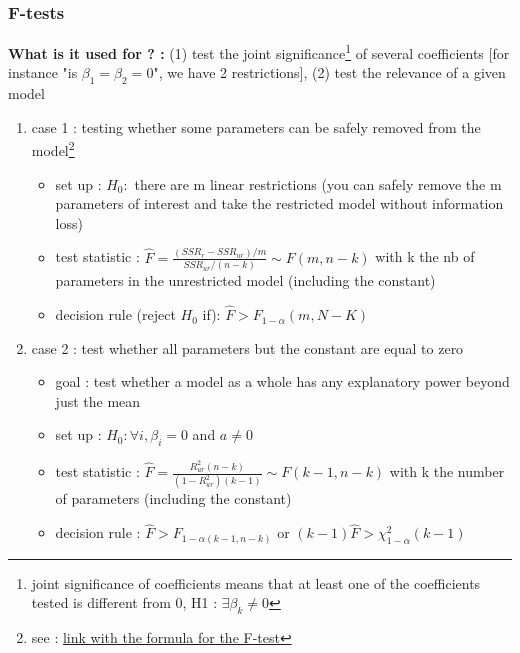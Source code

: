 \documentclass{article}
\begin{document}
\subsubsection{F-tests}
\begin{Fisherbox}
\textbf{What is it used for ? :} (1) test the joint significance\footnote{joint significance of coefficients means that at least one of the coefficients tested is different from 0, H1 : $\exists\beta_k\neq0$} of several coefficients [for instance "is $\beta_1=\beta_2=0$", we have 2 restrictions], (2)  test the relevance of a given model 
\begin{enumerate}
    \item case 1 : testing whether some parameters can be safely removed from the model\footnote{see :  \href{https://www.statisticshowto.com/probability-and-statistics/hypothesis-testing/f-test/}{link with the formula for the F-test} }
    \begin{itemize}
        \item set up : $H_0 :$ there are m linear restrictions (you can safely remove the m parameters of interest and take the restricted model without information loss)
        \item test statistic : $\hat{F}= \frac{(SSR_{r}-SSR_{ur})/m}{SSR_{ur}/(n-k)}\sim F(m,n-k) $ with k the nb of parameters in the unrestricted model (including the constant)
        \item decision rule (reject $H_0$ if): $\hat{F}>F_{1-\alpha}(m, N-K)$
    \end{itemize}
    \item case 2 : test whether all parameters but the constant are equal to zero 
    \begin{itemize}
        \item goal : test whether a model as a whole has any explanatory power beyond just the mean 
        \item set up : $H_0 : \forall i, \beta_i=0$ and $a\neq0$ 
        \item test statistic : $\hat{F}=\frac{R^2_{ur}(n-k)}{(1-R^2_{ur})(k-1)}\sim F(k-1,n-k)$ with k the number of parameters (including the constant)
        \item decision rule : $\hat{F}>F_{1-\alpha(k-1,n-k)}$ or $(k-1)\hat{F} >\chi^2_{1-\alpha}(k-1)$
    \end{itemize}
\end{enumerate}
\end{Fisherbox}
\end{document}
